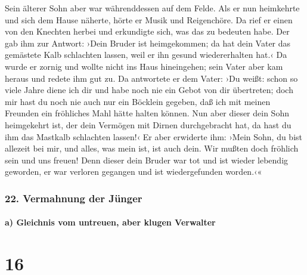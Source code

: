  Sein älterer Sohn aber war währenddessen auf dem Felde.
Als er nun heimkehrte und sich dem Hause näherte, hörte er Musik und
Reigenchöre.  Da rief er einen von den Knechten herbei
und erkundigte sich, was das zu bedeuten habe.  Der gab
ihm zur Antwort: ›Dein Bruder ist heimgekommen; da hat dein Vater das
gemästete Kalb schlachten lassen, weil er ihn gesund wiedererhalten
hat.‹  Da wurde er zornig und wollte nicht ins Haus
hineingehen; sein Vater aber kam heraus und redete ihm gut zu.
 Da antwortete er dem Vater: ›Du weißt: schon so viele
Jahre diene ich dir und habe noch nie ein Gebot von dir übertreten; doch
mir hast du noch nie auch nur ein Böcklein gegeben, daß ich mit meinen
Freunden ein fröhliches Mahl hätte halten können.  Nun
aber dieser dein Sohn heimgekehrt ist, der dein Vermögen mit Dirnen
durchgebracht hat, da hast du ihm das Mastkalb schlachten lassen!‹
 Er aber erwiderte ihm: ›Mein Sohn, du bist allezeit bei
mir, und alles, was mein ist, ist auch dein.  Wir mußten
doch fröhlich sein und uns freuen! Denn dieser dein Bruder war tot und
ist wieder lebendig geworden, er war verloren gegangen und ist
wiedergefunden worden.‹«

\hypertarget{vermahnung-der-juxfcnger}{%
\subsubsection{22. Vermahnung der
Jünger}\label{vermahnung-der-juxfcnger}}

\hypertarget{a-gleichnis-vom-untreuen-aber-klugen-verwalter}{%
\paragraph{a) Gleichnis vom untreuen, aber klugen
Verwalter}\label{a-gleichnis-vom-untreuen-aber-klugen-verwalter}}

\hypertarget{section-15}{%
\section{16}\label{section-15}}

